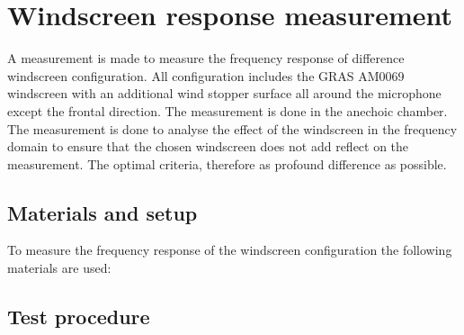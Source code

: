 \chapter{Windscreen response measurement}\label{ap:wind_screen_freq_res}
A measurement is made to measure the frequency response of difference windscreen configuration. All configuration includes the GRAS AM0069 windscreen with an additional wind stopper surface all around the microphone except the frontal direction. The measurement is done in the anechoic chamber. The measurement is done to analyse the effect of the windscreen in the frequency domain to ensure that the chosen windscreen does not add reflect on the measurement. The optimal criteria, therefore as profound difference as possible. 



\section*{Materials and setup}
To measure the frequency response of the windscreen configuration the following materials are used:

\startequipment
{}
\stopequipment
\startequipment
{}
\stopequipment




\section*{Test procedure}


